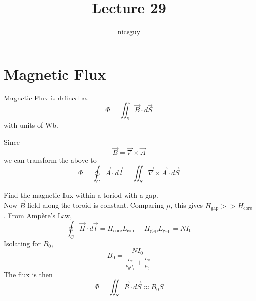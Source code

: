 \documentclass[12pt]{article}
\author{niceguy}
\title{Lecture 29}
\begin{document}
\maketitle

\section{Magnetic Flux}

\begin{defn}
    Magnetic Flux is defined as
    $$\Phi = \iint_S \vec B \cdot d\vec S$$
    with units of Wb.
\end{defn}

Since
$$\vec B = \vec \nabla \times \vec A$$
we can transform the above to
$$\Phi = \ointctrclockwise_C \vec A \cdot d\vec l = \iint_S \vec \nabla \times \vec A \cdot d\vec S$$

\begin{ex}
    Find the magnetic flux within a toriod with a gap. \\
    Now $\vec B$ field along the toroid is constant. Comparing $\mu$, this gives $H_{\text{gap}} >> H_{\text{core}}$. From Amp\`ere's Law,
    $$\oint_C \vec H \cdot d\vec l = H_{\text{core}}L_{\text{core}} + H_{\text{gap}}L_{\text{gap}} = NI_0$$
    Isolating for $B_0$,
    $$B_0 = \frac{NI_0}{\frac{L_c}{\mu_0\mu_r} + \frac{L_g}{\mu_0}}$$
    The flux is then
    $$\Phi = \iint_S \vec B \cdot d\vec{S} \approx B_0S$$
\end{ex}
\end{document}
